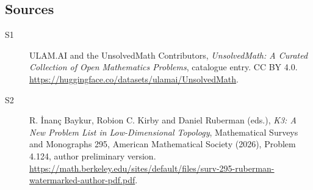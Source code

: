 \documentclass[11pt]{article}
\begin{document}
\subsection{Sources}
\begin{description}
\item[\hypertarget{source:statement:1}{S1}] ULAM.AI and the UnsolvedMath Contributors, \emph{UnsolvedMath: A Curated Collection of Open Mathematics Problems}, catalogue entry. CC BY 4.0. \url{https://huggingface.co/datasets/ulamai/UnsolvedMath}.
\item[\hypertarget{source:statement:2}{S2}] R. İnanç Baykur, Robion C. Kirby and Daniel Ruberman (eds.), \emph{K3: A New Problem List in Low-Dimensional Topology}, Mathematical Surveys and Monographs 295, American Mathematical Society (2026), Problem 4.124, author preliminary version. \url{https://math.berkeley.edu/sites/default/files/surv-295-ruberman-watermarked-author-pdf.pdf}.
\end{description}
\label{end:statement}
\end{document}
